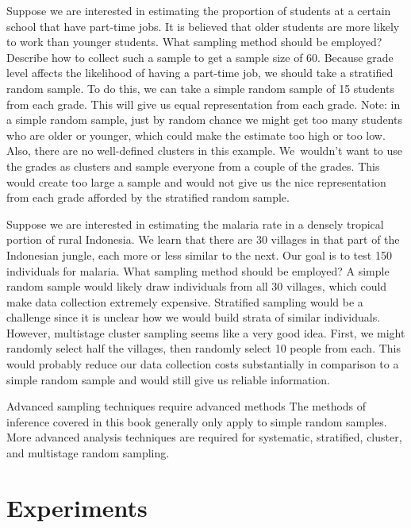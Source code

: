 \begin{example}{Suppose we are interested in estimating the proportion of students at a certain school that have part-time jobs. It is believed that older students are more likely to work than younger students. What sampling method should be employed? Describe how to collect such a sample to get a sample size of 60.}
Because grade level affects the likelihood of having a part-time job, we should take a stratified random sample. To do this, we can take a simple random sample of 15 students from each grade. This will give us equal representation from each grade. Note: in a simple random sample, just by random chance we might get too many students who are older or younger, which could make the estimate too high or too low. Also, there are no well-defined clusters in this example. We~wouldn't want to use the grades as clusters and sample everyone from a couple of the grades. This would create too large a sample and would not give us the nice representation from each grade afforded by the stratified random sample.
\end{example}

\begin{example}{Suppose we are interested in estimating the malaria rate in a densely tropical portion of rural Indonesia. We learn that there are 30 villages in that part of the Indonesian jungle, each more or less similar to the next. Our goal is to test 150 individuals for malaria. What sampling method should be employed?}
A simple random sample would likely draw individuals from all 30 villages, which could make data collection extremely expensive. Stratified sampling would be a challenge since it is unclear how we would build strata of similar individuals. However, multistage cluster sampling seems like a very good idea. First, we might randomly select half the villages, then randomly select 10 people from each. This would probably reduce our data collection costs substantially in comparison to a simple random sample and would still give us reliable information.
\end{example}

\begin{caution}{Advanced sampling techniques require advanced methods}
{The methods of inference covered in this book generally only apply to simple random samples. More advanced analysis techniques are required for systematic, stratified, cluster, and multistage random sampling.}
\end{caution}


\section[Experiments]{Experiments }
\label{experimentsSection}

